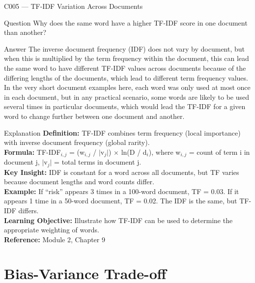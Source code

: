 \documentclass[aspectratio=169,8pt]{beamer}
\begin{document}
	\begin{frame}{C005 --- TF-IDF Variation Across Documents}
		\begin{block}{Question}
			Why does the same word have a higher TF-IDF score in one document than another?
		\end{block}
		\begin{block}{Answer}
			The inverse document frequency (IDF) does not vary by document, but when this is multiplied by the term frequency within the document, this can lead the same word to have different TF-IDF values across documents because of the differing lengths of the documents, which lead to different term frequency values. In the very short document examples here, each word was only used at most once in each document, but in any practical scenario, some words are likely to be used several times in particular documents, which would lead the TF-IDF for a given word to change further between one document and another.
		\end{block}
		\begin{block}{Explanation}
			\textbf{Definition:} TF-IDF combines term frequency (local importance) with inverse document frequency (global rarity).\\
			\textbf{Formula:} TF-IDF$_{i,j}$ = (w$_{i,j}$ / $|$v$_j$$|$) $\times$ ln(D / d$_i$), where w$_{i,j}$ = count of term i in document j, $|$v$_j$$|$ = total terms in document j.\\
			\textbf{Key Insight:} IDF is constant for a word across all documents, but TF varies because document lengths and word counts differ.\\
			\textbf{Example:} If ``risk'' appears 3 times in a 100-word document, TF = 0.03. If it appears 1 time in a 50-word document, TF = 0.02. The IDF is the same, but TF-IDF differs.\\
			\textbf{Learning Objective:} Illustrate how TF-IDF can be used to determine the appropriate weighting of words.\\
			\textbf{Reference:} Module 2, Chapter 9
		\end{block}
	\end{frame}
	
	\section{Bias-Variance Trade-off}
	
\end{document}
